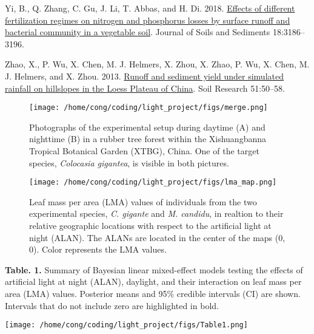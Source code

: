 \documentclass[
  12pt,
  letterpaper,
  DIV=11,
  numbers=noendperiod]{scrartcl}
\newlength{\cslhangindent}
\newlength{\cslentryspacingunit} %
\newenvironment{CSLReferences}[2] %
 {%
  \setlength{\parindent}{0pt}
  \ifodd #1
  \let\oldpar\par
  \def\par{\hangindent=\cslhangindent\oldpar}
  \fi
  \setlength{\parskip}{#2\cslentryspacingunit}
 }%
 {}
\begin{document}
\begin{CSLReferences}{1}{0}
\leavevmode{}%
Yi, B., Q. Zhang, C. Gu, J. Li, T. Abbas, and H. Di. 2018.
\href{https://doi.org/10.1007/s11368-018-1991-6}{Effects of different
fertilization regimes on nitrogen and phosphorus losses by surface
runoff and bacterial community in a vegetable soil}. Journal of Soils
and Sediments 18:3186--3196.

\leavevmode{}%
Zhao, X., P. Wu, X. Chen, M. J. Helmers, X. Zhou, X. Zhao, P. Wu, X.
Chen, M. J. Helmers, and X. Zhou. 2013.
\href{https://doi.org/10.1071/SR12239}{Runoff and sediment yield under
simulated rainfall on hillslopes in the {Loess Plateau} of {China}}.
Soil Research 51:50--58.

\end{CSLReferences}

\newpage

\begin{figure}

{\centering \texttt{[image: /home/cong/coding/light\_project/figs/merge.png]}

}

\caption{\label{fig-alan}Photographs of the experimental setup during
daytime (A) and nighttime (B) in a rubber tree forest within the
Xishuangbanna Tropical Botanical Garden (XTBG), China. One of the target
species, \emph{Colocasia gigantea}, is visible in both pictures.}

\end{figure}

\newpage

\begin{figure}

{\centering \texttt{[image: /home/cong/coding/light\_project/figs/lma\_map.png]}

}

\caption{\label{fig-LMA}Leaf mass per area (LMA) values of individuals
from the two experimental species, \emph{C. gigante} and \emph{M.
candidu}, in realtion to their relative geographic locations with
respect to the artificial light at night (ALAN). The ALANs are located
in the center of the maps (0, 0). Color represents the LMA values.}

\end{figure}

\newpage

\textbf{Table. 1.} Summary of Bayesian linear mixed-effect models
testing the effects of artificial light at night (ALAN), daylight, and
their interaction on leaf mass per area (LMA) values. Posterior means
and 95\% credible intervals (CI) are shown. Intervals that do not
include zero are highlighted in bold.

\texttt{[image: /home/cong/coding/light\_project/figs/Table1.png]}
\end{document}

